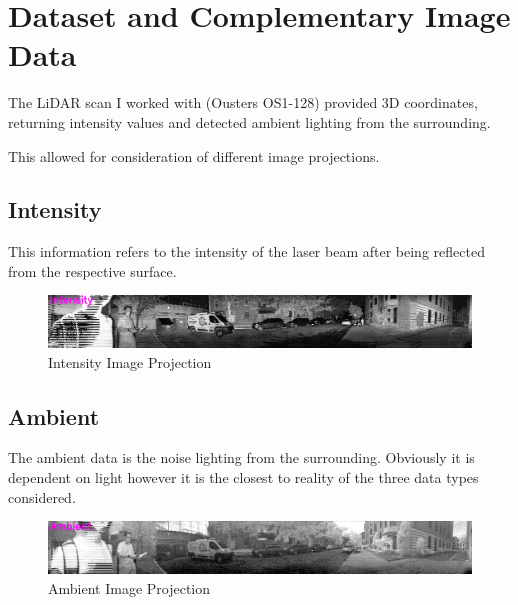 \chapter{Dataset and Complementary Image Data}\label{ch:dataset}

The LiDAR scan I worked with (Ousters OS1-128) provided 3D coordinates, returning intensity values and detected ambient lighting from the surrounding. 

This allowed for consideration of different image projections.

\section{Intensity}{
    
    This information refers to the intensity of the laser beam after being reflected from the respective surface. 
    \begin{figure}[h]
        \centering
        \includegraphics[scale=0.19]{images/dataset/intensity.png}
        \caption{Intensity Image Projection}
        \label{fig:intensity}
    \end{figure}
}

\section{Ambient}{

    The ambient data is the noise lighting from the surrounding. Obviously it is dependent on light however it is the closest to reality of the three data types considered.

    \begin{figure}[h]
        \centering
        \includegraphics[scale=0.19]{images/dataset/ambient.png}
        \caption{Ambient Image Projection}
        \label{fig:ambient}
    \end{figure}
}
\clearpage

